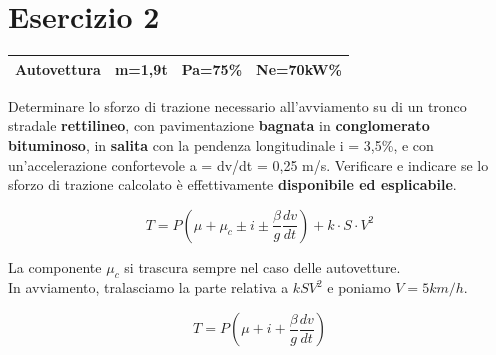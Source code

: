 \documentclass[
a4paper,
12pt, 
twoside]{scrbook}
\begin{document}
{{    \section{Esercizio 2}
    \leavevmode\newline
    {
    	\centering
    	\begin{tabular}{|c|c|c|c|}
    		\hline
    		\rule[-1ex]{0pt}{2.5ex}  Autovettura & m=1,9t & Pa=75\% & Ne=70kW\% \\
    		\hline
    	\end{tabular}\par
    }
    \leavevmode\newline
    
    \begin{boxK}
    	Determinare lo sforzo di trazione necessario all’avviamento su di un tronco stradale \textbf{rettilineo}, con pavimentazione \textbf{bagnata} in \textbf{conglomerato bituminoso}, in \textbf{salita} con la pendenza longitudinale i = 3,5\%, e con un’accelerazione confortevole a = dv/dt = 0,25 m/s\texttwosuperior. Verificare e indicare se lo sforzo di trazione calcolato è effettivamente \textbf{disponibile ed esplicabile}. 
    \end{boxK}
    
    \begin{equation}
    	T=P(\mu+\mu_{c}\pm i\pm \frac{\beta}{g}\frac{dv}{dt})+k\cdot S\cdot V^{2}
    \end{equation}
    
    \begin{boxF}
    	La componente $\mu_{c}$ si trascura sempre nel caso delle autovetture.\\
    	In avviamento, tralasciamo la parte relativa a $kSV^{2}$ e poniamo $V=5km/h$. 
    \end{boxF}
    
    {
    	\centering
    
    \begin{equation}
    	T=P(\mu+i+\frac{\beta}{g}\frac{dv}{dt})
    \end{equation}
    
}}}
\end{document}
